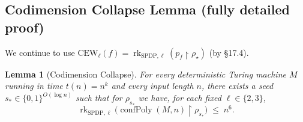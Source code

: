 \documentclass[12pt]{article}
\newtheorem{lemma}[theorem]{Lemma}
\theoremstyle{definition}
\theoremstyle{definition}
\theoremstyle{remark}
\theoremstyle{remark}
\begin{document}
\subsection{Codimension Collapse Lemma (fully detailed proof)}

We continue to use $\mathrm{CEW}_\ell(f) = \operatorname{rk}_{\mathrm{SPDP},\ell}(p_f \upharpoonright \rho_\star)$ (by \S17.4).

\begin{lemma}[Codimension Collapse]\label{lem:codim-collapse}
For every deterministic Turing machine $M$ running in time $t(n)=n^k$ and every input length $n$, there exists a seed $s_* \in \{0,1\}^{O(\log n)}$ such that for $\rho_{s_*}$ we have, for each fixed $\ell\in\{2,3\}$,
\[
\operatorname{rk}_{\mathrm{SPDP},\ell}\!\big(\operatorname{confPoly}(M,n)\!\upharpoonright\!\rho_{s_*}\big)\;\le\;n^{6}.
\]
\end{lemma}
\end{document}
